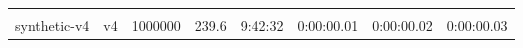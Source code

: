 \begin{table}
\begin{center}
\begin{tabular}{llrr|rrrr}
& & & & & & & \\
synthetic-v4    & v4       & 1000000 &  239.6 &   9:42:32 &   0:00:00.01 &   0:00:00.02 &   0:00:00.03 \\ \hline
\end{tabular}
\end{center}
\end{table}
